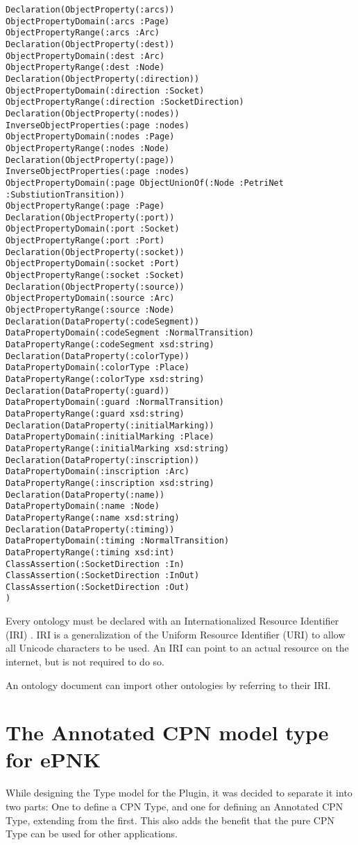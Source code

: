 \begin{lstlisting}[label=lst:cpn.owl,caption=The CPN Ontology]
Declaration(ObjectProperty(:arcs))
ObjectPropertyDomain(:arcs :Page)
ObjectPropertyRange(:arcs :Arc)
Declaration(ObjectProperty(:dest))
ObjectPropertyDomain(:dest :Arc)
ObjectPropertyRange(:dest :Node)
Declaration(ObjectProperty(:direction))
ObjectPropertyDomain(:direction :Socket)
ObjectPropertyRange(:direction :SocketDirection)
Declaration(ObjectProperty(:nodes))
InverseObjectProperties(:page :nodes)
ObjectPropertyDomain(:nodes :Page)
ObjectPropertyRange(:nodes :Node)
Declaration(ObjectProperty(:page))
InverseObjectProperties(:page :nodes)
ObjectPropertyDomain(:page ObjectUnionOf(:Node :PetriNet :SubstiutionTransition))
ObjectPropertyRange(:page :Page)
Declaration(ObjectProperty(:port))
ObjectPropertyDomain(:port :Socket)
ObjectPropertyRange(:port :Port)
Declaration(ObjectProperty(:socket))
ObjectPropertyDomain(:socket :Port)
ObjectPropertyRange(:socket :Socket)
Declaration(ObjectProperty(:source))
ObjectPropertyDomain(:source :Arc)
ObjectPropertyRange(:source :Node)
Declaration(DataProperty(:codeSegment))
DataPropertyDomain(:codeSegment :NormalTransition)
DataPropertyRange(:codeSegment xsd:string)
Declaration(DataProperty(:colorType))
DataPropertyDomain(:colorType :Place)
DataPropertyRange(:colorType xsd:string)
Declaration(DataProperty(:guard))
DataPropertyDomain(:guard :NormalTransition)
DataPropertyRange(:guard xsd:string)
Declaration(DataProperty(:initialMarking))
DataPropertyDomain(:initialMarking :Place)
DataPropertyRange(:initialMarking xsd:string)
Declaration(DataProperty(:inscription))
DataPropertyDomain(:inscription :Arc)
DataPropertyRange(:inscription xsd:string)
Declaration(DataProperty(:name))
DataPropertyDomain(:name :Node)
DataPropertyRange(:name xsd:string)
Declaration(DataProperty(:timing))
DataPropertyDomain(:timing :NormalTransition)
DataPropertyRange(:timing xsd:int)
ClassAssertion(:SocketDirection :In)
ClassAssertion(:SocketDirection :InOut)
ClassAssertion(:SocketDirection :Out)
)

\end{lstlisting}

Every ontology must be declared with an Internationalized Resource
Identifier (IRI) . IRI is a generalization of the Uniform Resource Identifier
(URI) to allow all Unicode characters to be used. An IRI can point to an actual
resource on the internet, but is not required to do so.

An ontology document can import other ontologies by referring to their IRI. 

\section{The Annotated CPN model type for ePNK}
While designing the Type model for the Plugin, it was decided to separate it
into two parts: One to define a CPN Type, and one for defining an Annotated CPN
Type, extending from the first. This also adds the benefit that the pure CPN
Type can be used for other applications.

